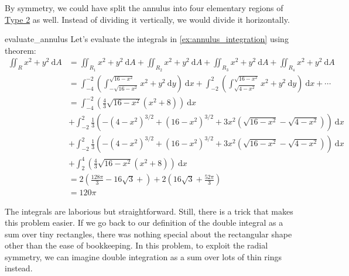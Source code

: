 \begin{remark}
    By symmetry, we could have split the annulus into four elementary regions of \hyperref[eq:elregtype2]{Type 2} as well. Instead of dividing it vertically, we would divide it horizontally.
\end{remark}

\begin{aexample}{}{evaluate_annulus}
    Let's evaluate the integrals in \ref{ex:annulus_integration} using  theorem:
    \begin{equation*}
        \begin{aligned}
            \iint_R x^2+y^2 \ \mathrm{d} A &= \iint_{R_1} x^2+y^2 \ \mathrm{d} A + \iint_{R_2} x^2+y^2 \ \mathrm{d} A +\iint_{R_3} x^2+y^2 \ \mathrm{d} A +\iint_{R_4} x^2+y^2 \ \mathrm{d} A \\
            &= \int_{-4}^{-2} \left( \int_{-\sqrt{16-x^2}}^{\sqrt{16-x^2}} x^2+y^2 \ \mathrm{d} y\right) \ \mathrm{d} x + \int_{-2}^{2} \left( \int_{\sqrt{4-x^2}}^{\sqrt{16-x^2}} x^2+y^2 \ \mathrm{d} y\right) \ \mathrm{d} x +\cdots\\
            &= \int_{-4}^{-2} \left(\frac{4}{3} \sqrt{16-x^2} \left(x^2+8\right)\right) \ \mathrm{d} x  \\ 
            &+ \int_{-2}^{2} \frac{1}{3} \left(-\left(4-x^2\right)^{3/2}+\left(16-x^2\right)^{3/2}+3 x^2 \left(\sqrt{16-x^2}-\sqrt{4-x^2}\right)\right) \ \mathrm{d} x \\
            &+ \int_{-2}^{2} \frac{1}{3} \left(-\left(4-x^2\right)^{3/2}+\left(16-x^2\right)^{3/2}+3 x^2 \left(\sqrt{16-x^2}-\sqrt{4-x^2}\right)\right) \ \mathrm{d} x \\
            &+ \int_{2}^{4} \left(\frac{4}{3} \sqrt{16-x^2} \left(x^2+8\right)\right) \ \mathrm{d} x  \\ 
            &= 2\left(\frac{128 \pi }{3}-16 \sqrt{3} + \right) + 2\left(16 \sqrt{3}+\frac{52 \pi }{3}\right) \\
            &= 120 \pi
        \end{aligned}
    \end{equation*}

    The integrals are laborious but straightforward. Still, there is a trick that makes this problem easier. If we go back to our definition of the double integral as a sum over tiny rectangles, there was nothing special about the rectangular shape other than the ease of bookkeeping. In this problem, to exploit the radial symmetry, we can imagine double integration as a sum over lots of thin rings instead. 
    

\end{aexample}
